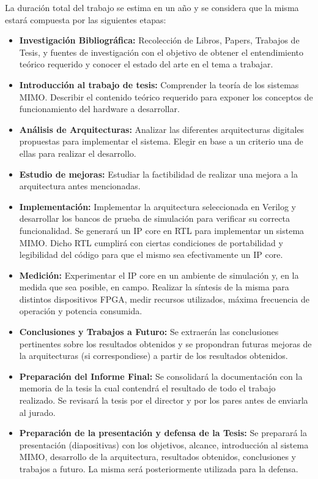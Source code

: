 \documentclass[a4paper]{article}
\begin{document}
La duración total del trabajo se estima en un año y se considera que la misma estará compuesta por las siguientes etapas:

\begin{itemize}
    \item \textbf{Investigación Bibliográfica:} Recolección de Libros, Papers, Trabajos de Tesis, y fuentes de investigación con el objetivo de obtener el entendimiento teórico requerido y conocer el estado del arte en el tema a trabajar.
    \item \textbf{Introducción al trabajo de tesis:} Comprender la teoría de los sistemas MIMO. Describir el contenido teórico requerido para exponer los conceptos de funcionamiento del hardware a desarrollar.
    \item \textbf{Análisis de Arquitecturas:} Analizar las diferentes arquitecturas digitales propuestas para implementar el sistema. Elegir en base a un criterio una de ellas para realizar el desarrollo.
    \item \textbf{Estudio de mejoras:} Estudiar la factibilidad de realizar una mejora a la arquitectura antes mencionadas.
    \item \textbf{Implementación:} Implementar la arquitectura seleccionada en Verilog y desarrollar los bancos de prueba de simulación para verificar su correcta funcionalidad. Se generará un IP core en RTL para implementar un sistema MIMO. Dicho RTL cumplirá con ciertas condiciones de portabilidad y legibilidad del código para que el mismo sea efectivamente un IP core.
    \item \textbf{Medición:} Experimentar el IP core en un ambiente de simulación y, en la medida que sea posible, en campo. Realizar la síntesis de la misma para distintos dispositivos FPGA, medir recursos utilizados, máxima frecuencia de operación y potencia consumida.
    \item \textbf{Conclusiones y Trabajos a Futuro:} Se extraerán las conclusiones pertinentes sobre los resultados obtenidos y se propondran futuras mejoras de la arquitecturas (si correspondiese) a partir de los resultados obtenidos.
    \item \textbf{Preparación del Informe Final:} Se consolidará la documentación con la memoria de la tesis la cual contendrá el resultado de todo el trabajo realizado. Se revisará la tesis por el director y por los pares antes de enviarla al jurado.
    \item \textbf{Preparación de la presentación y defensa de la Tesis:} Se preparará la presentación (diapositivas) con los objetivos, alcance, introducción al sistema MIMO, desarrollo de la arquitectura, resultados obtenidos, conclusiones y trabajos a futuro. La misma será posteriormente utilizada para la defensa.
\end{itemize}
\end{document}
